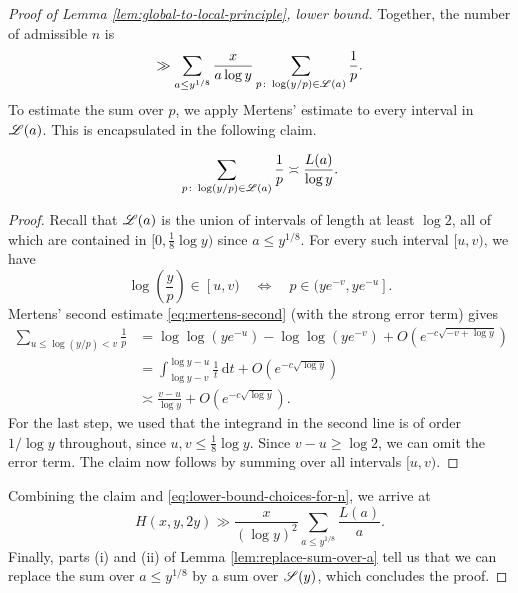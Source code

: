 \begin{proof}[Proof of Lemma \ref{lem:global-to-local-principle}, lower bound]
    Together, the number of admissible $n$ is
    \begin{equation} \label{eq:lower-bound-choices-for-n}
        \gg \sum \limits_{a \le y^{1/8}} \frac{x}{a \log y} \sum \limits_{p \colon \log (y/p) \in \mathscr{L}(a)} \frac{1}{p}. 
    \end{equation}
    To estimate the sum over $p$, we apply Mertens' estimate to every interval in $\mathscr{L}(a)$. 
    This is encapsulated in the following claim.
    \begin{claim*}
        \begin{equation*}
            \sum \limits_{p \colon \log (y/p) \in \mathscr{L}(a)} \frac{1}{p} \asymp \frac{L(a)}{\log y}.
        \end{equation*}
    \end{claim*}
    \begin{proof}
        \renewcommand{\qedsymbol}{$\Diamond$}
        Recall that $\mathscr{L}(a)$ is the union of intervals of length at least $\log 2$, all of which are contained in $[0, \frac{1}{8}\log y)$ since $a \le y^{1/8}$.
        For every such interval $[u, v)$, we have
        \begin{equation*}
            \log\left(\frac{y}{p} \right) \in [u, v) \quad \Longleftrightarrow \quad p \in (ye^{-v}, ye^{-u}].
        \end{equation*}
        Mertens' second estimate \eqref{eq:mertens-second} (with the strong error term) gives
        \begin{align*}
            \sum \limits_{u \le \log (y/p) < v} \frac{1}{p} 
            &= \log \log (ye^{-u}) - \log \log (ye^{-v}) + O\left(e^{-c\sqrt{-v+\log y}}\right) \\
            &= \int_{\log y -v}^{\log y -u} \frac{1}{t}\,\mathrm d t + O\left(e^{-c\sqrt{\log y}}\right) \\ 
            &\asymp \frac{v - u}{\log y} + O\left(e^{-c\sqrt{\log y}}\right).
        \end{align*}
        For the last step, we used that the integrand in the second line is of order $1/\log y$ throughout, since $u, v\le \frac{1}{8} \log y$.
        Since $v - u \ge \log 2$, we can omit the error term. 
        The claim now follows by summing over all intervals $[u, v)$.
    \end{proof}

    Combining the claim and \eqref{eq:lower-bound-choices-for-n}, we arrive at
    \begin{equation*}
        H(x, y, 2y) \gg \frac{x}{(\log y)^2} \sum \limits_{a \le y^{1/8}} \frac{L(a)}{a}.
    \end{equation*}
    Finally, parts (i) and (ii) of Lemma \ref{lem:replace-sum-over-a} tell us that we can replace the sum over $a \le y^{1/8}$ by a sum over $\mathscr{S}(y)$, which concludes the proof.
\end{proof}

